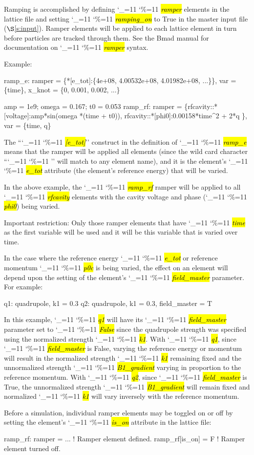 \documentclass{hitec}
\newcommand\dottcmd[1]{\hl{\em#1}\endgroup}
\newcommand{\vn}{\begingroup\catcode`\_=11 \catcode`\%=11 \dottcmd}
\newcommand{\sref}[1]{$\S$\ref{#1}}
\begin{document}
Ramping is accomplished by defining \vn{ramper} elements in the lattice file and setting
\vn{ramping_on} to True in the master input file (\sref{s:input}). Ramper elements will be applied
to each lattice element in turn before particles are tracked through them. See the Bmad manual for
documentation on \vn{ramper} syntax.

Example:
\begin{code}
  ramp_e: ramper = \{*[e_tot]:\{4e+08, 4.00532e+08, 4.01982e+08, ...\}\},
                var = \{time\}, x_knot = \{0, 0.001, 0.002, ...\}

  amp = 1e9;  omega = 0.167;  t0 = 0.053
  ramp_rf: ramper = \{rfcavity::*[voltage]:amp*sin(omega *(time + t0)),
        rfcavity::*[phi0]:0.00158*time^2 + 2*q \}, var = \{time, q\}
\end{code}
The ``\vn{*[e_tot]}'' construct in the definition of \vn{ramp_e} means that the ramper will be
applied all elements (since the wild card character ``\vn{*}'' will match to any element name), and
it is the element's \vn{e_tot} attribute (the element's reference energy) that will be varied.

In the above example, the \vn{ramp_rf} ramper will be applied to all \vn{rfcavity} elements with
the cavity voltage and phase (\vn{phi0}) being varied.

Important restriction: Only those
ramper elements that have \vn{time} as the first variable will be used and it will be this variable
that is varied over time. 

In the case where the reference energy \vn{e_tot} or reference momentum \vn{p0c} is being varied, the
effect on an element will depend upon the setting of the element's \vn{field_master} parameter. For
example:
\begin{code}
  q1: quadrupole, k1 = 0.3
  q2: quadrupole, k1 = 0.3, field_master = T
\end{code}
In this example, \vn{q1} will have its \vn{field_master} parameter set to \vn{False} since the
quadrupole strength was specified using the normalized strength \vn{k1}. With \vn{q1}, since
\vn{field_master} is False, varying the reference energy or momentum will result in the normalized
strength \vn{k1} remaining fixed and the unnormalized strength \vn{B1_gradient} varying in
proportion to the reference momentum. With \vn{q2}, since \vn{field_master} is True, the
unnormalized strength \vn{B1_gradient} will remain fixed and normalized \vn{k1} will vary
inversely with the reference momentum.

Before a simulation, individual ramper elements may be toggled on or off by setting the element's
\vn{is_on} attribute in the lattice file: 
\begin{code}
  ramp_rf: ramper = ...  ! Ramper element defined.
  ramp_rf[is_on] = F     ! Ramper element turned off.
\end{code}
\end{document}
